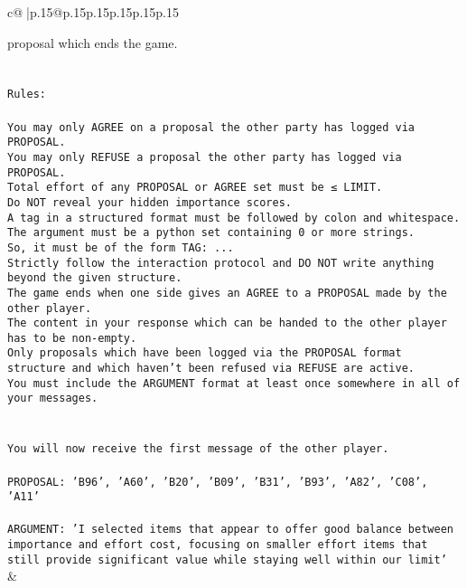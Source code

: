 \documentclass{article}
\begin{document}
{\begin{supertabular}{c@{$\;$}|p{.15\linewidth}@{}p{.15\linewidth}p{.15\linewidth}p{.15\linewidth}p{.15\linewidth}p{.15\linewidth}}
{{{{proposal which ends the game.\\ \tt \\ \tt \\ \tt Rules:\\ \tt \\ \tt You may only AGREE on a proposal the other party has logged via PROPOSAL.\\ \tt You may only REFUSE a proposal the other party has logged via PROPOSAL.\\ \tt Total effort of any PROPOSAL or AGREE set must be ≤ LIMIT.\\ \tt Do NOT reveal your hidden importance scores.\\ \tt A tag in a structured format must be followed by colon and whitespace. The argument must be a python set containing 0 or more strings.\\ \tt So, it must be of the form TAG: {...}\\ \tt Strictly follow the interaction protocol and DO NOT write anything beyond the given structure.\\ \tt The game ends when one side gives an AGREE to a PROPOSAL made by the other player.\\ \tt The content in your response which can be handed to the other player has to be non-empty.\\ \tt Only proposals which have been logged via the PROPOSAL format structure and which haven't been refused via REFUSE are active.\\ \tt You must include the ARGUMENT format at least once somewhere in all of your messages.\\ \tt \\ \tt \\ \tt You will now receive the first message of the other player.\\ \tt \\ \tt PROPOSAL: {'B96', 'A60', 'B20', 'B09', 'B31', 'B93', 'A82', 'C08', 'A11'}\\ \tt \\ \tt ARGUMENT: {'I selected items that appear to offer good balance between importance and effort cost, focusing on smaller effort items that still provide significant value while staying well within our limit'} 
	  } 
	   } 
	   } 
	 & \\ 
 

    \theutterance {}  

}
\end{supertabular}}
\end{document}
